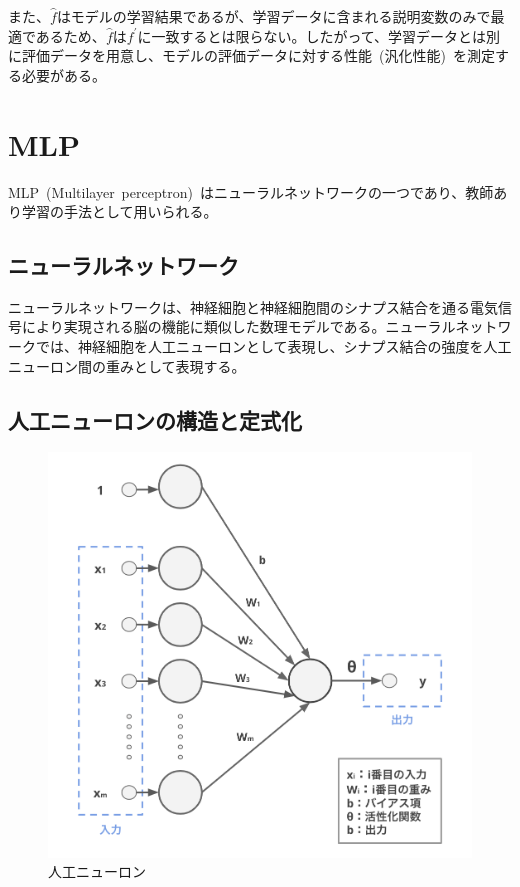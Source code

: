 また、$\hat{f}$はモデルの学習結果であるが、学習データに含まれる説明変数のみで最適であるため、$\hat{f}$は$f^{'}$に一致するとは限らない。したがって、学習データとは別に評価データを用意し、モデルの評価データに対する性能~(汎化性能)~を測定する必要がある。

\clearpage

\section{MLP}

MLP~(Multilayer~perceptron)~はニューラルネットワークの一つであり、教師あり学習の手法として用いられる。

\subsection{ニューラルネットワーク}

ニューラルネットワークは、神経細胞と神経細胞間のシナプス結合を通る電気信号により実現される脳の機能に類似した数理モデルである。ニューラルネットワークでは、神経細胞を人工ニューロンとして表現し、シナプス結合の強度を人工ニューロン間の重みとして表現する。

\subsection{人工ニューロンの構造と定式化}
\label{subsec:neuron}

\begin{figure}[b]
\begin{center}
\includegraphics[width=0.6\hsize]{figure/neuron.png}
\caption{人工ニューロン}
\label{fig:neuron}
\end{center}
\end{figure}

